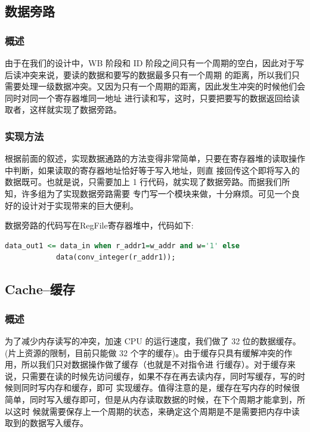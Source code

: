 \documentclass[10pt]{article}
\begin{document}
\begin{CJK}{UTF8}{gbsn}
\subsection{数据旁路}
\subsubsection{概述}
由于在我们的设计中，WB 阶段和 ID 阶段之间只有一个周期的空白，因此对于写后读冲突来说，要读的数据和要写的数据最多只有一个周期
的距离，所以我们只需要处理一级数据冲突。又因为只有一个周期的距离，因此发生冲突的时候他们会同时对同一个寄存器堆同一地址
进行读和写，这时，只要把要写的数据返回给读取者，这样就实现了数据旁路。

\subsubsection{实现方法}
根据前面的叙述，实现数据通路的方法变得非常简单，只要在寄存器堆的读取操作中判断，如果读取的寄存器地址恰好等于写入地址，则直
接回传这个即将写入的数据既可。也就是说，只需要加上 1 行代码，就实现了数据旁路。而据我们所知，许多组为了实现数据旁路需要
专门写一个模块来做，十分麻烦。可见一个良好的设计对于实现带来的巨大便利。

数据旁路的代码写在RegFile寄存器堆中，代码如下:\\
\begin{lstlisting}[language=vhdl]
data_out1 <= data_in when r_addr1=w_addr and w='1' else   
            data(conv_integer(r_addr1));
\end{lstlisting}


\subsection{Cache--缓存}
\subsubsection{概述}
为了减少内存读写的冲突，加速 CPU 的运行速度，我们做了 32 位的数据缓存。
(片上资源的限制，目前只能做 32 个字的缓存)。由于缓存只具有缓解冲突的作用，所以我们只对数据操作做了缓存（也就是不对指令进
行缓存）。对于缓存来说，只需要在读的时候先访问缓存，如果不存在再去读内存，同时写缓存，写的时候则同时写内存和缓存，即可
实现缓存。值得注意的是，缓存在写内存的时候很简单，同时写入缓存即可，但是从内存读取数据的时候，在下个周期才能拿到，所以这时
候就需要保存上一个周期的状态，来确定这个周期是不是需要把内存中读取到的数据写入缓存。


\end{CJK}
\end{document}
